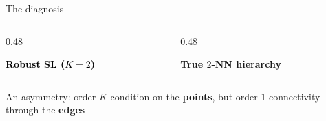 \documentclass[A4,svgnames,9pt,aspectratio=169]{beamer}
\begin{document}
\begin{frame}{The diagnosis}
    \begin{columns}[c, onlytextwidth]
        \begin{column}{0.48\textwidth}
            \begin{center}
                \textcolor{black}{\textbf{Robust SL ($K=2$)}}

                \vspace{0.4cm}
                
            \end{center}
        \end{column}

        \begin{column}{0.48\textwidth}
            \begin{center}
                \textcolor{inria-rouge}{\textbf{True $2$-NN hierarchy}}

                \vspace{0.4cm}
                
            \end{center}
        \end{column}
    \end{columns}
    \vspace{0.25cm}
    \begin{center}
        \normalsize An asymmetry: order-$K$ condition on the \textbf{points}, but order-$1$ connectivity through the \textbf{edges}
    \end{center}
\end{frame}
\end{document}
